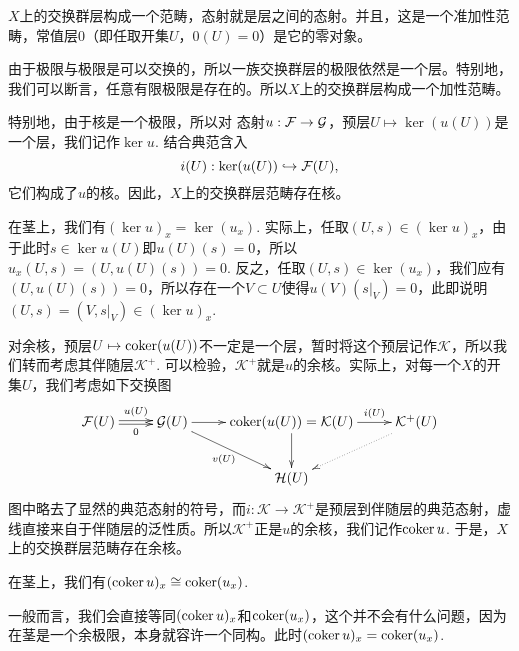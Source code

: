 \begin{para}
$X$上的交换群层构成一个范畴，态射就是层之间的态射。并且，这是一个准加性范畴，常值层$0$（即任取开集$U$，$0(U)=0$）是它的零对象。

由于极限与极限是可以交换的，所以一族交换群层的极限依然是一个层。特别地，我们可以断言，任意有限极限是存在的。所以$X$上的交换群层构成一个加性范畴。

特别地，由于核是一个极限，所以对
态射$u:\mathcal{F}\to\mathcal{G}$，预层$U\mapsto \ker(u(U))$是一个层，我们记作$\ker u$. 结合典范含入
\[
	i(U):\ker(u(U))\hookrightarrow \mathcal{F}(U),
\]
它们构成了$u$的核。因此，$X$上的交换群层范畴存在核。

在茎上，我们有$(\ker u)_x=\ker(u_x)$. 实际上，任取$(U,s)\in (\ker u)_x$，由于此时$s\in \ker u(U)$即$u(U)(s)=0$，所以$u_x(U,s)=(U,u(U)(s))=0$. 反之，任取$(U,s)\in \ker(u_x)$，我们应有$(U,u(U)(s))=0$，所以存在一个$V\subset U$使得$u(V)(s|_V)=0$，此即说明$(U,s)=(V,s|_V)\in (\ker u)_x$.

对余核，预层$U\mapsto \operatorname{coker}(u(U))$不一定是一个层，暂时将这个预层记作$\mathcal{K}$，所以我们转而考虑其伴随层$\mathcal{K}^+$. 可以检验，$\mathcal{K}^+$就是$u$的余核。实际上，对每一个$X$的开集$U$，我们考虑如下交换图
\[
	\xymatrix{
		\calf(U)\ar@<0.3ex>[r]^-{u(U)} \ar@<-0.3ex>[r]_-{0}&\calg(U)\ar[r]\ar[dr]_-{v(U)}&\coker(u(U))=\mathcal{K}(U)\ar[d]\ar[r]^-{i(U)}&\mathcal{K}^+(U)\ar@{.>}[ld]\\
		&&\mathcal{H}(U)&
	}
\]
图中略去了显然的典范态射的符号，而$i:\mathcal{K}\to \mathcal{K}^+$是预层到伴随层的典范态射，虚线直接来自于伴随层的泛性质。所以$\mathcal{K}^+$正是$u$的余核，我们记作$\operatorname{coker} u$. 于是，$X$上的交换群层范畴存在余核。
\end{para}

\begin{lem}
在茎上，我们有$(\operatorname{coker} u)_x\cong \operatorname{coker}(u_x)$. 
\end{lem}

一般而言，我们会直接等同$(\operatorname{coker} u)_x$和$\operatorname{coker}(u_x)$，这个并不会有什么问题，因为在茎是一个余极限，本身就容许一个同构。此时$(\operatorname{coker} u)_x=\operatorname{coker}(u_x)$.

